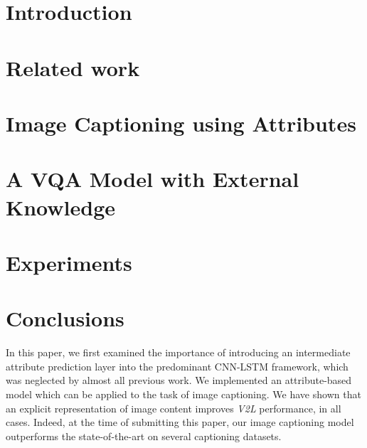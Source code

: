 \documentclass[10pt,journal,compsoc]{IEEEtran}
\def\V2L{\textit{V2L}}
\begin{document}
\IEEEdisplaynontitleabstractindextext
\IEEEpeerreviewmaketitle



%
\section{Introduction}
\label{sec:introduction}


\section{Related work}
\label{sec:related_work}


\section{Image Captioning using Attributes}
\label{sec:image_captioning}


\section{A VQA Model with External Knowledge}
\label{sec:vqa}


\section{Experiments}
\label{sec:exp}


\vspace{-8pt}
\section{Conclusions}



In this paper, we first examined the importance of introducing an intermediate attribute prediction layer into the predominant CNN-LSTM framework,
which was neglected by almost all previous work.
We implemented an attribute-based model which can be applied to the task of image captioning. We have shown that an explicit representation of image content improves \V2L performance, in all cases. Indeed, at the time of submitting this paper,
our image captioning model outperforms the state-of-the-art on several captioning datasets.
\end{document}
